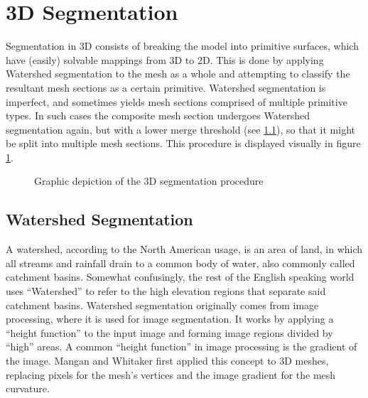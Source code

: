 \section{3D Segmentation}
Segmentation in 3D consists of breaking the model into primitive surfaces, which have (easily) solvable mappings from 3D to 2D.
This is done by applying Watershed segmentation to the mesh as a whole and attempting to classify the resultant mesh sections as a certain primitive.
Watershed segmentation is imperfect, and sometimes yields mesh sections comprised of multiple primitive types.
In such cases the composite mesh section undergoes Watershed segmentation again, but with a lower merge threshold (see \ref{ws_seg}), so that it might be split into multiple mesh sections.
This procedure is displayed visually in figure \ref{fig:Seg3D}.

\begin{figure}
	\centering
{}
	\caption{Graphic depiction of the 3D segmentation procedure}
	\label{fig:Seg3D}
\end{figure}

\subsection{Watershed Segmentation}\label{ws_seg}
A watershed, according to the North American usage, is an area of land, in which all streams and rainfall drain to a common body of water\cite{USGS_Watersheds}, also commonly called catchment basins.
Somewhat confusingly, the rest of the English speaking world uses ``Watershed'' to refer to the high elevation regions that separate said catchment basins.
Watershed segmentation originally comes from image processing, where it is used for image segmentation\cite{ImageSegWS, DigitalImageProc}.
It works by applying a ``height function'' to the input image and forming image regions divided by ``high'' areas.
A common ``height function'' in image processing is the gradient of the image\cite{ImageSegWS}.
Mangan and Whitaker first applied this concept to 3D meshes, replacing pixels for the mesh's vertices and the image gradient for the mesh curvature\cite{Watershed}.

